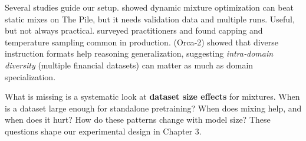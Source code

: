 Several studies guide our setup. \textcite{xie2023doremi} showed dynamic mixture optimization can beat static mixes on The Pile, but it needs validation data and multiple runs. Useful, but not always practical. \textcite{longpre2023pretrainer} surveyed practitioners and found capping and temperature sampling common in production. \textcite{mitra2023orca2} (Orca‑2) showed that diverse instruction formats help reasoning generalization, suggesting \textit{intra‑domain diversity} (multiple financial datasets) can matter as much as domain specialization.

What is missing is a systematic look at \textbf{dataset size effects} for mixtures. When is a dataset large enough for standalone pretraining? When does mixing help, and when does it hurt? How do these patterns change with model size? These questions shape our experimental design in Chapter 3.
